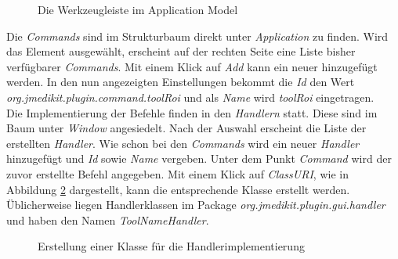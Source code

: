 \begin{figure}[H]
  \vspace{0.5cm}
  \centering
   \caption{Die Werkzeugleiste im Application Model}
  \label{toolmenu}
  \vspace{0.5cm}
\end{figure}

Die \textit{Commands} sind im Strukturbaum direkt unter \textit{Application} zu finden. Wird das Element ausgewählt, erscheint auf der rechten Seite eine Liste bisher verfügbarer \textit{Commands}. Mit einem Klick auf \textit{Add} kann ein neuer hinzugefügt werden. In den nun angezeigten Einstellungen bekommt die \textit{Id} den Wert \textit{org.jmedikit.plugin.command.toolRoi} und als \textit{Name} wird \textit{toolRoi} eingetragen.\\
Die Implementierung der Befehle finden in den \textit{Handlern} statt. Diese sind im Baum unter \textit{Window} angesiedelt. Nach der Auswahl erscheint die Liste der erstellten \textit{Handler}. Wie schon bei den \textit{Commands} wird ein neuer \textit{Handler} hinzugefügt und \textit{Id} sowie \textit{Name} vergeben. Unter dem Punkt \textit{Command} wird der zuvor erstellte Befehl angegeben. Mit einem Klick auf \textit{ClassURI}, wie in Abbildung \ref{tool_handlerclass} dargestellt, kann die entsprechende Klasse erstellt werden. Üblicherweise liegen Handlerklassen im Package \textit{org.jmedikit.plugin.gui.handler} und haben den Namen \textit{ToolNameHandler}.

\begin{figure}[H]
  \vspace{0.5cm}
  \centering
   \caption{Erstellung einer Klasse für die Handlerimplementierung}
  \label{tool_handlerclass}
  \vspace{0.5cm}
\end{figure}

